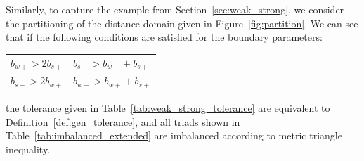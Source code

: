 Similarly, to capture the example from Section~\ref{sec:weak_strong},
we consider the partitioning of the distance domain given in
Figure~\ref{fig:partition}. We can see that if the following
conditions are satisfied for the boundary parameters: 

\begin{tabular}{p{1.5in}p{1in}}
$b_{w+}  > 2b_{s+}$ & $b_{s-}  > b_{w-} + b_{s+}$  \\
$b_{s-}  > 2b_{w+}$ & $b_{w-}  > b_{w+}+b_{s+}$
\end{tabular} 

\noindent the tolerance given in
Table~\ref{tab:weak_strong_tolerance} are equivalent to
Definition~\ref{def:gen_tolerance}, and all triads shown in
Table~\ref{tab:imbalanced_extended} are imbalanced according to metric triangle
inequality.
